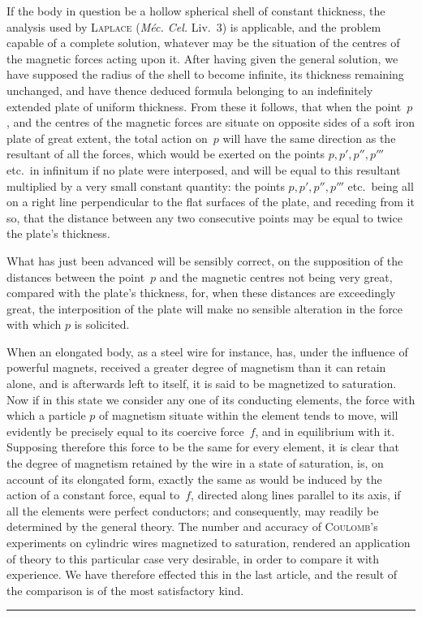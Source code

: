 \documentclass[12pt,notitlepage]{amsart}
\let\Person\textsc
\let\Title\textit
\def\Crule{\begin{center}\rule[.5ex]{5em}{.2pt}\\[10pt]\end{center}}
\begin{document}
If the body in question be a hollow spherical shell of constant
thickness, the analysis used by \Person{Laplace}
(\Title{M\'ec. Cel.} Liv.~3) is applicable, and
the problem capable of a complete solution, whatever may be the situation
of the centres of the magnetic forces acting upon it. After having given the
general solution, we have supposed the radius of the shell to become infinite,
its thickness remaining unchanged, and have thence deduced formula belonging
to an indefinitely extended plate of uniform thickness. From these it follows,
that when the point~$p$, and the centres of the magnetic forces are situate on
opposite sides of a soft iron plate of great extent,
the total action on~$p$ will
have the same direction as the resultant of all the forces, which would be
exerted on the points $p, p', p'', p'''$ etc.\ in
infinitum if no plate were interposed,
and will be equal to this resultant multiplied by a very small constant
quantity: the points $p, p', p'', p'''$ etc.\ being
all on a right line perpendicular
to the flat surfaces of the plate,
and receding from it so, that the distance between
any two consecutive points may be equal to twice the plate's thickness.

What has just been advanced will be sensibly correct, on the supposition
of the distances between the point~$p$ and the magnetic centres not being
very great, compared with the plate's thickness, for, when these distances
are exceedingly great, the interposition of the plate will make no sensible
alteration in the force with which $p$ is solicited.

When an elongated body, as a steel wire for instance, has, under the
influence of powerful magnets, received a greater degree of magnetism than
it can retain alone, and is afterwards left to itself,
it is said to be magnetized
to saturation. Now if in this state we consider any one of its conducting
elements, the force with which a particle $p$ of magnetism situate within the
element tends to move,
will evidently be precisely equal to its coercive force~$f$,
and in equilibrium with it. Supposing therefore this force to be the same for
every element, it is clear that the degree of magnetism retained by the wire
in a state of saturation, is, on account of its elongated form, exactly the same
as would be induced by the action of a constant force, equal to~$f$, directed
along lines parallel to its axis, if all the elements were perfect conductors;
and consequently, may readily be determined by the general theory. The number
and accuracy of \Person{Coulomb}'s experiments
on cylindric wires magnetized to saturation,
rendered an application of theory to this particular case very desirable,
in order to compare it with experience. We have therefore effected this in the
last article, and the result of the comparison is of the most satisfactory kind.
\bigskip
\Crule
\bigskip
\bigskip
\bigskip
\end{document}
